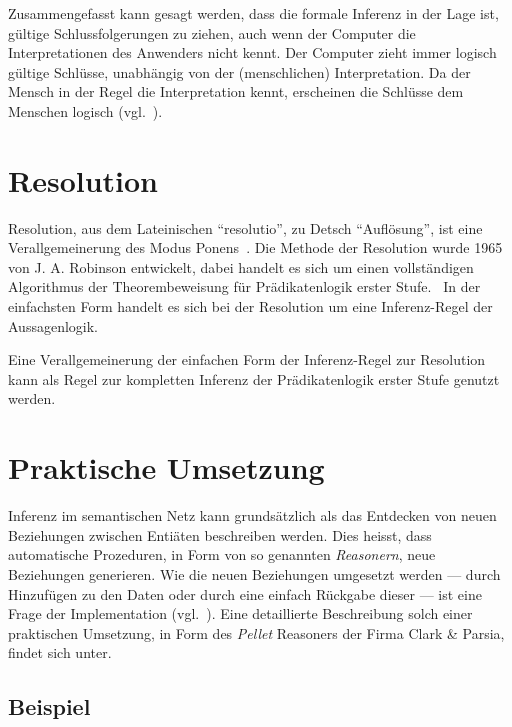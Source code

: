 Zusammengefasst kann gesagt werden, dass die formale Inferenz in der Lage ist, gültige Schlussfolgerungen zu ziehen, auch wenn der Computer die Interpretationen des Anwenders nicht kennt. Der Computer zieht immer logisch gültige Schlüsse, unabhängig von der (menschlichen) Interpretation. Da der Mensch in der Regel die Interpretation kennt, erscheinen die Schlüsse dem Menschen logisch (vgl.~\cite[S. 165]{russel}).

\section{Resolution}
\label{sec:resolution}

Resolution, aus dem Lateinischen ``resolutio'', zu Detsch ``Auflösung'', ist eine Verallgemeinerung des Modus Ponens~\cite[S. 279]{russel}. Die Methode der Resolution wurde 1965 von J. A. Robinson entwickelt, dabei handelt es sich um einen vollständigen Algorithmus der Theorembeweisung für Prädikatenlogik erster Stufe.~\cite[S. 18]{russel} In der einfachsten Form handelt es sich bei der Resolution um eine Inferenz-Regel der Aussagenlogik.~\cite[S. 277]{russel}

Eine Verallgemeinerung der einfachen Form der Inferenz-Regel zur Resolution kann als Regel zur kompletten Inferenz der Prädikatenlogik erster Stufe genutzt werden.~\cite[S. 278]{russel}

\section{Praktische Umsetzung}
\label{sec:inferenz_praktisch}

Inferenz im semantischen Netz kann grundsätzlich als das Entdecken von neuen Beziehungen zwischen Entiäten beschreiben werden. Dies heisst, dass automatische Prozeduren, in Form von so genannten \textit{Reasonern}, neue Beziehungen generieren. Wie die neuen Beziehungen umgesetzt werden --- durch Hinzufügen zu den Daten oder durch eine einfach Rückgabe dieser --- ist eine Frage der Implementation (vgl.~\cite[Abschnitt 1]{w3inference}). Eine detaillierte Beschreibung solch einer praktischen Umsetzung, in Form des \textit{Pellet} Reasoners der Firma Clark \& Parsia, findet sich unter.%

\subsection{Beispiel}
\label{subsec:inferenz_beispiel}

